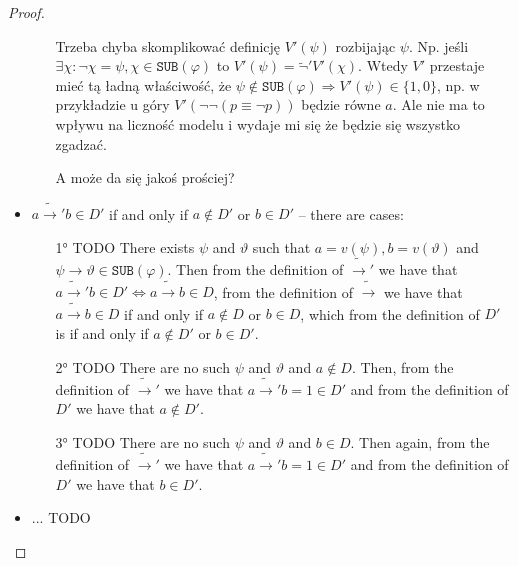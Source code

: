 \documentclass{article}
\theoremstyle{definition}
\theoremstyle{definition}
\theoremstyle{definition}
\newcommand*{\id}{\equiv}
\newcommand*{\ra}{\rightarrow}
\newcommand*{\SUB}{\texttt{SUB}}
\begin{document}
\begin{proof}
\begin{itemize}
\begin{enumerate}
{                              Trzeba chyba skomplikować definicję $V'(\psi)$ rozbijając $\psi$. Np. jeśli
                              $\exists \chi: \lnot \chi = \psi, \chi \in \SUB(\varphi)$ to $V'(\psi) =
                                  \tilde{\lnot}'V'(\chi)$. Wtedy $V'$ przestaje mieć tą ładną właściwość, że
                              $\psi \not \in \SUB(\varphi) \Rightarrow V'(\psi) \in \{1, 0\}$, np. w
                              przykładzie u góry $V'(\lnot \lnot (p \id \lnot p))$ będzie równe $a$. Ale nie
                              ma to wpływu na liczność modelu i wydaje mi się że będzie się wszystko zgadzać.

                              A może da się jakoś prościej? }
              \end{enumerate}
        \item $a \tilde{\ra}'b \in D'$ if and only if $a \not \in D'$ or $b \in D'$ -- there are cases:
              \begin{enumerate}
                  \item[1°] TODO There exists $\psi$ and $\vartheta$ such that $a = v(\psi), b=v(\vartheta)$ and $\psi \ra \vartheta \in \SUB(\varphi)$. Then from the definition of $\tilde{\ra}'$ we have that $a \tilde{\ra}'b \in D' \iff a \tilde{\ra} b \in D$, from the definition of $\tilde{\ra}$ we have that $a \tilde{\ra} b \in D$ if and only if $a \not \in D$ or $b \in D$, which from the definition of $D'$ is if and only if $a \not \in D'$ or $b \in D'$.
                  \item[2°] TODO There are no such $\psi$ and $\vartheta$ and $a \not \in D$. Then, from the definition of $\tilde{\ra}'$ we have that $a \tilde{\ra}' b = 1 \in D'$ and from the definition of $D'$ we have that $a \not \in D'$.
                  \item[3°] TODO There are no such $\psi$ and $\vartheta$ and $b \in D$. Then again, from the definition of $\tilde{\ra}'$ we have that $a \tilde{\ra}' b = 1 \in D'$ and from the definition of $D'$ we have that $b \in D'$.
              \end{enumerate}
        \item ... TODO
    \end{itemize}
\end{proof}
\end{document}
